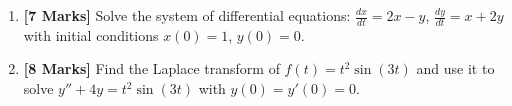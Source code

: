 \documentclass[11pt,a4paper]{article}
\begin{document}
\begin{enumerate}[label=\textbf{Q\arabic*.}, leftmargin=2em]
    \vspace{1em}

    \item \textbf{[7 Marks]} Solve the system of differential equations: $\frac{dx}{dt} = 2x - y$, $\frac{dy}{dt} = x + 2y$ with initial conditions $x(0) = 1$, $y(0) = 0$.
    
    \vspace{1em}

    \item \textbf{[8 Marks]} Find the Laplace transform of $f(t) = t^2 \sin(3t)$ and use it to solve $y'' + 4y = t^2 \sin(3t)$ with $y(0) = y'(0) = 0$.
    
    \vspace{1em}

\end{enumerate}
\end{document}
